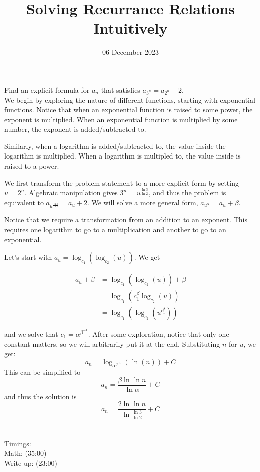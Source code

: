 \documentclass{article}
\title{Solving Recurrance Relations Intuitively}
\date {06 December 2023}
\begin{document}
\maketitle

Find an explicit formula for \(a_n\) that satisfies \(a_{3^n}=a_{2^n}+2\). \\

We begin by exploring the nature of different functions, starting with exponential functions. Notice that when an exponential function is raised to some power, the exponent is multiplied. When an exponential function is multiplied by some number, the exponent is added/subtracted to.

Similarly, when a logarithm is added/subtracted to, the value inside the logarithm is multiplied. When a logarithm is multipled to, the value inside is raised to a power.

We first transform the problem statement to a more explicit form by setting \(u=2^n\). Algebraic manipulation gives \(3^n=u^{\frac{\ln{3}}{\ln{2}}}\), and thus the problem is equivalent to \(a_{u^{\frac{\ln{3}}{\ln{2}}}}=a_{u}+2\). We will solve a more general form, \(a_{u^\alpha}=a_{u}+\beta\).

Notice that we require a transformation from an addition to an exponent. This requires one logarithm to go to a multiplication and another to go to an exponential.

Let's start with \(a_u=\log_{c_1}(\log_{c_2}(u))\). We get

\begin{align*}
a_u + \beta &= \log_{c_1}(\log_{c_2}(u)) + \beta \\
&= \log_{c_1}(c_1^\beta \log_{c_2}(u)) \\
&= \log_{c_1}(\log_{c_2}(u^{c_1^\beta}))
\end{align*}

and we solve that \(c_1=\alpha^{\beta^{-1}}\). After some exploration, notice that only one constant matters, so we will arbitrarily put it at the end. Substituting \(n\) for \(u\), we get:
\[a_n = \log_{\alpha^{\beta^{-1}}}(\ln (n)) + C\]
This can be simplified to
\[a_n = \frac{\beta \ln \ln n}{\ln \alpha} + C\]
and thus the solution is
\[a_n = \frac{2\ln \ln n}{\ln \frac{\ln{3}}{\ln{2}}} + C\]
\\ \\
Timings: \\
Math: (35:00) \\
Write-up: (23:00)
\end{document}

